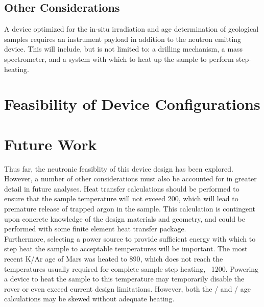 \documentclass{mc2015}
\begin{document}
\subsection{Other Considerations}

A device optimized for the in-situ irradiation and age determination of geological samples requires an instrument payload in addition to the neutron emitting device. This will include, but is not limited to: a drilling mechanism, a mass spectrometer, and a system with which to heat up the sample to perform step-heating. 

\section{Feasibility of Device Configurations}

\section{Future Work}

Thus far, the neutronic feasiblity of this device design has been explored. However, a number of other considerations must also be accounted for in greater detail in future analyses. Heat transfer calculations should be performed to ensure that the sample temperature will not exceed 200\celsius, which will lead to premature release of trapped argon in the sample. This calculation is contingent upon concrete knowledge of the design materials and geometry, and could be performed with some finite element heat transfer package. \\

Furthermore, selecting a power source to provide sufficient energy with which to step heat the sample to acceptable temperatures will be important. The most recent K/Ar age of Mars was heated to 890\celsius \cite{farley_situ_2014}, which does not reach the temperatures usually required for complete sample step heating, ~1200\celsius \cite{mcdougall_geochronology_1999}. Powering a device to heat the sample to this temperature may temporarily disable the rover or even exceed current design limitations. However, both the /  and /  age calculations may be skewed without adequate heating. \\
\end{document}
